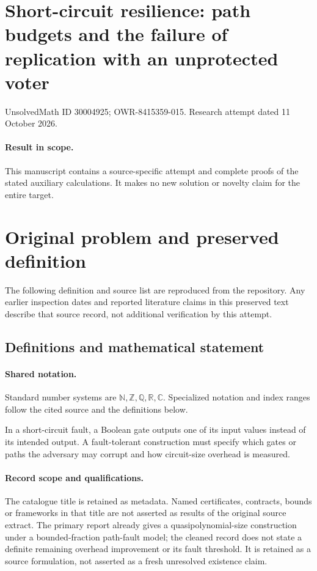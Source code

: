 \documentclass[11pt]{article}
\begin{document}
\section*{Short-circuit resilience: path budgets and the failure of replication with an unprotected voter}
\noindent UnsolvedMath ID 30004925; OWR-8415359-015. Research attempt dated 11 October 2026.
\paragraph{Result in scope.}This manuscript contains a source-specific attempt and complete proofs of the stated auxiliary calculations. It makes no new solution or novelty claim for the entire target.
\section{Original problem and preserved definition}
The following definition and source list are reproduced from the repository. Any earlier inspection dates and reported literature claims in this preserved text describe that source record, not additional verification by this attempt.
\subsection{Definitions and mathematical statement}

\paragraph{Shared notation.}Standard number systems are $\mathbb N,\mathbb Z,\mathbb Q,\mathbb R,\mathbb C$. Specialized notation and index ranges follow the cited source and the definitions below.


In a short-circuit fault, a Boolean gate outputs one of its input values instead of its intended output. A fault-tolerant construction must specify which gates or paths the adversary may corrupt and how circuit-size overhead is measured.
\paragraph{Record scope and qualifications.}
The catalogue title is retained as metadata. Named certificates, contracts, bounds or frameworks in that title are not asserted as results of the original source extract.
The primary report already gives a quasipolynomial-size construction under a bounded-fraction path-fault model; the cleaned record does not state a definite remaining overhead improvement or its fault threshold. It is retained as a source formulation, not asserted as a fresh unresolved existence claim.
\end{document}
